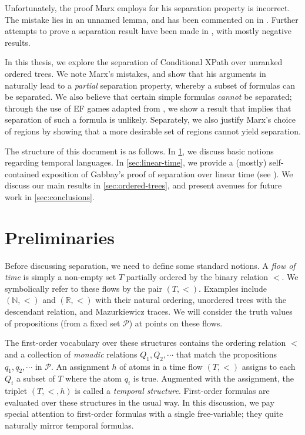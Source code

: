 \documentclass[a4paper,UKenglish,cleveref, autoref, thm-restate, numberwithinsect]{lipics-v2021}
\begin{document}
Unfortunately, the proof Marx employs for his separation property is incorrect. The mistake lies in an unnamed lemma, and has been commented on in \cite{BeJe07, nwtl}. Further attempts to prove a separation result have been made in \cite{BeCl16}, with mostly negative results.

In this thesis, we explore the separation of Conditional XPath over unranked ordered trees. We note Marx's mistakes, and show that his arguments in \cite{xpathComplete} naturally lead to a \textit{partial} separation property, whereby a subset of formulas can be separated. We also believe that certain simple formulas \textit{cannot} be separated; through the use of EF games adapted from \cite{EtWi00}, we show a result that implies that separation of such a formula is unlikely. Separately, we also justify Marx's choice of regions by showing that a more desirable set of regions cannot yield separation.

The structure of this document is as follows. In \cref{sec:preliminaries}, we discuss basic notions regarding temporal languages. In \cref{sec:linear-time}, we provide a (mostly) self-contained exposition of Gabbay's proof of separation over linear time (see \cite{DecPastImpFuture89, gabbay1994}). We discuss our main results in \cref{sec:ordered-trees}, and present avenues for future work in \cref{sec:conclusions}.

\section{Preliminaries}
\label{sec:preliminaries}

Before discussing separation, we need to define some standard notions. A \textit{flow of time} is simply a non-empty set $T$ partially ordered by the binary relation $<$. We symbolically refer to these flows by the pair $(T, <)$. Examples include $(\mathbb{N}, <)$ and $(\mathbb{R}, <)$ with their natural ordering, unordered trees with the descendant relation, and Mazurkiewicz traces. We will consider the truth values of propositions (from a fixed set $\mathcal{P}$) at points on these flows.

The first-order vocabulary over these structures contains the ordering relation $<$ and a collection of \textit{monadic} relations $Q_1, Q_2, \cdots$ that match the propositions $q_1, q_2, \cdots$ in $\mathcal{P}$. An assignment $h$ of atoms in a time flow $(T, <)$ assigns to each $Q_i$ a subset of $T$ where the atom $q_i$ is true. Augmented with the assignment, the triplet $(T, <, h)$ is called a \textit{temporal structure}. First-order formulas are evaluated over these structures in the usual way. In this discussion, we pay special attention to first-order formulas with a single free-variable; they quite naturally mirror temporal formulas.
\end{document}
